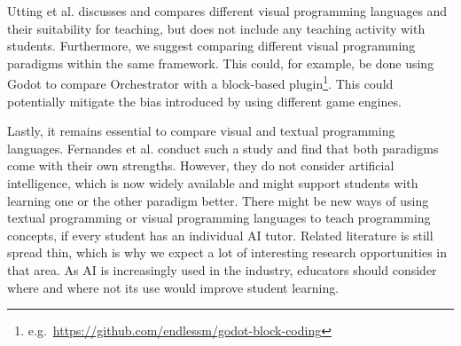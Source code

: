 Utting et al. \cite{utting_alice_2010} discusses and compares different visual programming languages and their suitability for teaching, but does not include any teaching activity with students.
Furthermore, we suggest comparing different visual programming paradigms within the same framework.
This could, for example, be done using Godot to compare Orchestrator with a block-based plugin\footnote{e.g.\ \url{https://github.com/endlessm/godot-block-coding}}.
This could potentially mitigate the bias introduced by using different game engines.

Lastly, it remains essential to compare visual and textual programming languages.
Fernandes et al. \cite{fernandes_blocks_2026} conduct such a study and find that both paradigms come with their own strengths.
However, they do not consider artificial intelligence, which is now widely available and might support students with learning one or the other paradigm better.
There might be new ways of using textual programming or visual programming languages to teach programming concepts, if every student has an individual AI tutor.
Related literature is still spread thin, which is why we expect a lot of interesting research opportunities in that area.
As AI is increasingly used in the industry, educators should consider where and where not its use would improve student learning.
